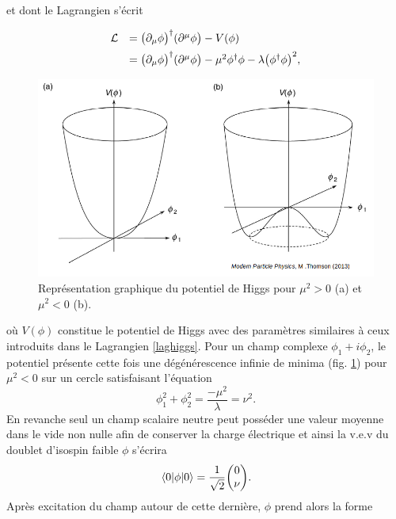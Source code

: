        et dont le Lagrangien s'écrit 

        \begin{equation}
        \begin{array}{ll}
            \mathcal{L}&=\bigl(\partial_{\mu}\phi\bigr)^{\dag}(\partial^{\mu}\phi\bigr)-V(\phi) \vspace{5pt} \\
            &=\bigl(\partial_{\mu}\phi\bigr)^{\dag}(\partial^{\mu}\phi\bigr)-\mu^2\phi^{\dag}\phi-\lambda\bigl(\phi^{\dag}\phi\bigr)^2,
        \end{array}
        \label{HiggsLag}
        \end{equation}

        \begin{figure}
        \centering
            \includegraphics[scale=0.4]{Chapitre2/Images/higgsV3D.png} 
            \caption{Représentation graphique du potentiel de Higgs pour $\mu^2>0$ (a) et $\mu^2<0$ (b).}
        \label{HiggsV3D}
        \end{figure}

        où $V(\phi)$ constitue le potentiel de Higgs avec des paramètres similaires à ceux introduits dans le Lagrangien \ref{laghiggs}. Pour un champ complexe $\phi_1+i\phi_2$, le potentiel présente cette fois une dégénérescence infinie de minima (fig. \ref{HiggsV3D}) pour $\mu^2<0$ sur un cercle satisfaisant l'équation $$\phi_1^2+\phi_2^2=\frac{-\mu^2}{\lambda}=\nu^2.$$ En revanche seul un champ scalaire neutre peut posséder une valeur moyenne dans le vide non nulle afin de conserver la charge électrique et ainsi la v.e.v du doublet d'isospin faible $\phi$ s'écrira $$\ev{\phi}{0}=\frac{1}{\sqrt{2}}\mqty(0 \\ \nu).$$ Après excitation du champ autour de cette dernière, $\phi$ prend alors la forme

